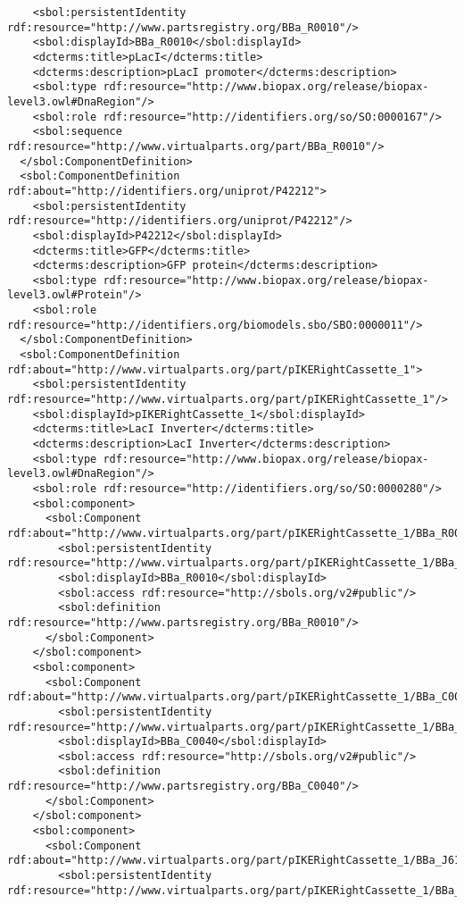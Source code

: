 \begin{lstlisting}
    <sbol:persistentIdentity rdf:resource="http://www.partsregistry.org/BBa_R0010"/>
    <sbol:displayId>BBa_R0010</sbol:displayId>
    <dcterms:title>pLacI</dcterms:title>
    <dcterms:description>pLacI promoter</dcterms:description>
    <sbol:type rdf:resource="http://www.biopax.org/release/biopax-level3.owl#DnaRegion"/>
    <sbol:role rdf:resource="http://identifiers.org/so/SO:0000167"/>
    <sbol:sequence rdf:resource="http://www.virtualparts.org/part/BBa_R0010"/>
  </sbol:ComponentDefinition>
  <sbol:ComponentDefinition rdf:about="http://identifiers.org/uniprot/P42212">
    <sbol:persistentIdentity rdf:resource="http://identifiers.org/uniprot/P42212"/>
    <sbol:displayId>P42212</sbol:displayId>
    <dcterms:title>GFP</dcterms:title>
    <dcterms:description>GFP protein</dcterms:description>
    <sbol:type rdf:resource="http://www.biopax.org/release/biopax-level3.owl#Protein"/>
    <sbol:role rdf:resource="http://identifiers.org/biomodels.sbo/SBO:0000011"/>
  </sbol:ComponentDefinition>
  <sbol:ComponentDefinition rdf:about="http://www.virtualparts.org/part/pIKERightCassette_1">
    <sbol:persistentIdentity rdf:resource="http://www.virtualparts.org/part/pIKERightCassette_1"/>
    <sbol:displayId>pIKERightCassette_1</sbol:displayId>
    <dcterms:title>LacI Inverter</dcterms:title>
    <dcterms:description>LacI Inverter</dcterms:description>
    <sbol:type rdf:resource="http://www.biopax.org/release/biopax-level3.owl#DnaRegion"/>
    <sbol:role rdf:resource="http://identifiers.org/so/SO:0000280"/>
    <sbol:component>
      <sbol:Component rdf:about="http://www.virtualparts.org/part/pIKERightCassette_1/BBa_R0010">
        <sbol:persistentIdentity rdf:resource="http://www.virtualparts.org/part/pIKERightCassette_1/BBa_R0010"/>
        <sbol:displayId>BBa_R0010</sbol:displayId>
        <sbol:access rdf:resource="http://sbols.org/v2#public"/>
        <sbol:definition rdf:resource="http://www.partsregistry.org/BBa_R0010"/>
      </sbol:Component>
    </sbol:component>
    <sbol:component>
      <sbol:Component rdf:about="http://www.virtualparts.org/part/pIKERightCassette_1/BBa_C0040">
        <sbol:persistentIdentity rdf:resource="http://www.virtualparts.org/part/pIKERightCassette_1/BBa_C0040"/>
        <sbol:displayId>BBa_C0040</sbol:displayId>
        <sbol:access rdf:resource="http://sbols.org/v2#public"/>
        <sbol:definition rdf:resource="http://www.partsregistry.org/BBa_C0040"/>
      </sbol:Component>
    </sbol:component>
    <sbol:component>
      <sbol:Component rdf:about="http://www.virtualparts.org/part/pIKERightCassette_1/BBa_J61130">
        <sbol:persistentIdentity rdf:resource="http://www.virtualparts.org/part/pIKERightCassette_1/BBa_J61130"/>

\end{lstlisting}
